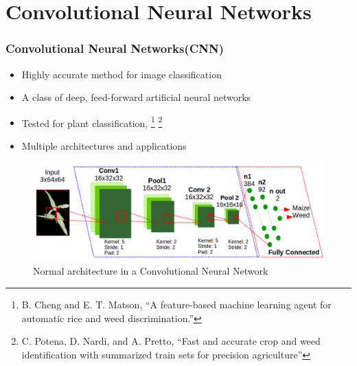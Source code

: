 \documentclass[10pt,a4paper]{beamer}
\begin{document}
\section{Convolutional Neural Networks}
\begin{frame}
\frametitle{Convolutional Neural Networks(CNN)}
\begin{itemize}
	\item Highly accurate method for image classification
	\item A class of deep, feed-forward artificial neural networks
	\item Tested for plant classification, \footnote{B. Cheng and E. T. Matson, “A feature-based machine learning agent for automatic rice and weed discrimination.”} \footnote{ C. Potena, D. Nardi, and A. Pretto, “Fast and accurate crop and weed identification with summarized train sets for precision agriculture”
}
	\item Multiple architectures and applications
\end{itemize}
	\begin{figure}[h]
	\centering
	\includegraphics[width=3.5 in]{arquitectura}
	\caption{Normal architecture in a Convolutional Neural Network}
	\label{figure4}
	\end{figure}
\end{frame}
\end{document}
